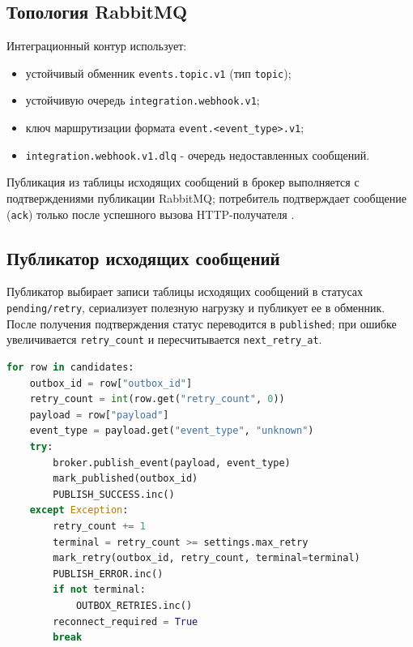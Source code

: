 \subsection{Топология RabbitMQ}

Интеграционный контур использует:
\begin{itemize}
    \item устойчивый обменник \texttt{events.topic.v1} (тип \texttt{topic});
    \item устойчивую очередь \texttt{integration.webhook.v1};
    \item ключ маршрутизации формата \texttt{event.<event\_type>.v1};
    \item \texttt{integration.webhook.v1.dlq} - очередь недоставленных сообщений.
\end{itemize}

Публикация из таблицы исходящих сообщений в брокер выполняется с подтверждениями публикации RabbitMQ; потребитель подтверждает сообщение (\texttt{ack}) только после успешного вызова HTTP-получателя \cite{rabbitmq_confirms,rabbitmq_dlq}.

\subsection{Публикатор исходящих сообщений}

Публикатор выбирает записи таблицы исходящих сообщений в статусах \texttt{pending/retry}, сериализует полезную нагрузку и публикует ее в обменник. После получения подтверждения статус переводится в \texttt{published}; при ошибке увеличивается \texttt{retry\_count} и пересчитывается \texttt{next\_retry\_at}.

\begin{lstlisting}[language=Python,caption={Цикл публикации исходящих сообщений с контролируемыми повторами},label={lst:outbox_publisher}]
for row in candidates:
    outbox_id = row["outbox_id"]
    retry_count = int(row.get("retry_count", 0))
    payload = row["payload"]
    event_type = payload.get("event_type", "unknown")
    try:
        broker.publish_event(payload, event_type)
        mark_published(outbox_id)
        PUBLISH_SUCCESS.inc()
    except Exception:
        retry_count += 1
        terminal = retry_count >= settings.max_retry
        mark_retry(outbox_id, retry_count, terminal=terminal)
        PUBLISH_ERROR.inc()
        if not terminal:
            OUTBOX_RETRIES.inc()
        reconnect_required = True
        break
\end{lstlisting}

